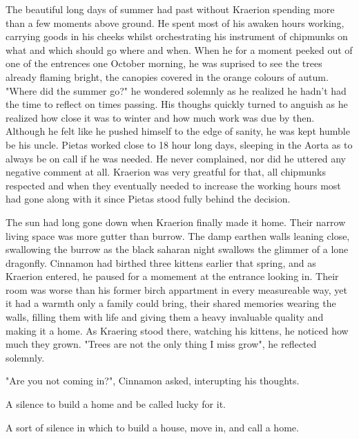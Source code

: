 \documentclass[smalldemyvopaper,11pt,twoside,onecolumn,openright,extrafontsizes]{memoir}
\begin{document}
The beautiful long days of summer had past without Kraerion spending more than a few moments above ground. He spent most of his awaken hours working, carrying goods in his cheeks whilst orchestrating his instrument of chipmunks on what and which should go where and when. When he for a moment peeked out of one of the entrences one October morning, he was suprised to see the trees already flaming bright, the canopies covered in the orange colours of autum. "Where did the summer go?" he wondered solemnly as he realized he hadn't had the time to reflect on times passing. His thoughs quickly turned to anguish as he realized how close it was to winter and how much work was due by then. Although he felt like he pushed himself to the edge of sanity, he was kept humble be his uncle. Pietas worked close to 18 hour long days, sleeping in the Aorta as to always be on call if he was needed. He never complained, nor did he uttered any negative comment at all. Kraerion was very greatful for that, all chipmunks respected and when they eventually needed to increase the working hours most had gone along with it since Pietas stood fully behind the decision.

The sun had long gone down when Kraerion finally made it home. Their narrow living space was more gutter than burrow. The damp earthen walls leaning close, swallowing the burrow as the black saharan night swallows the glimmer of a lone dragonfly. Cinnamon had birthed three kittens earlier that spring, and as Kraerion entered, he paused for a momement at the entrance looking in. Their room was worse than his former birch appartment in every measureable way, yet it had a warmth only a family could bring, their shared memories wearing the walls, filling them with life and giving them a heavy invaluable quality and making it a home. As Kraering stood there, watching his kittens, he noticed how much they grown. "Trees are not the only thing I miss grow", he reflected solemnly.

"Are you not coming in?", Cinnamon asked, interupting his thoughts. 

A silence to build a home and be called lucky for it.

A sort of silence in which to build a house, move in, and call a home. 


\newpage

\vspace*{4.3cm}
\begin{localsize}{10}
	\begin{quote}
	\end{quote} 
\end{localsize}
\vspace{1cm}
\end{document}
